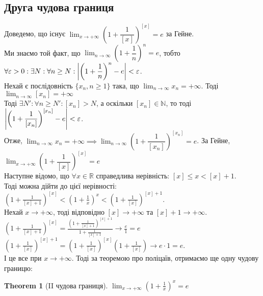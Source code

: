 \documentclass[a4paper, 14pt]{article}
\theoremstyle{theoremdd}
\newtheorem{theorem}{Theorem}[subsection]
\theoremstyle{theoremdd}
\theoremstyle{theoremdd}
\theoremstyle{theoremdd}
\theoremstyle{theoremdd}
\theoremstyle{theoremdd}
\theoremstyle{theoremdd}
\theoremstyle{theoremdd}
\begin{document}
\subsection{Друга чудова границя}
Доведемо, що існує $\displaystyle\lim_{x \to +\infty} \left( 1 + \dfrac{1}{[x]} \right)^{[x]} = e$ за Гейне.\\
Ми знаємо той факт, що $\displaystyle\lim_{n \to \infty} \left( 1 + \dfrac{1}{n} \right)^n = e$, тобто 
$\forall \varepsilon > 0: \exists N: \forall n \geq N: \abs{\left( 1 + \dfrac{1}{n} \right)^n - e} < \varepsilon$.\\
Нехай є послідовність $\{x_n, n \geq 1\}$ така, що $\displaystyle\lim_{n \to \infty} x_n = +\infty$. Тоді $\displaystyle\lim_{n \to \infty} [x_n] = +\infty$\\
Тоді $\exists N': \forall n \geq N': [x_n] > N$, а оскільки $[x_n] \in \mathbb{N}$, то тоді $\abs{\left( 1 + \dfrac{1}{[x_n]} \right)^{[x_n]} - e} < \varepsilon$.\\
Отже, $\displaystyle\lim_{n \to \infty} x_n = +\infty \implies \displaystyle\lim_{n \to \infty} \left( 1 + \dfrac{1}{[x_n]} \right)^{[x_n]} = e$. За Гейне, $\displaystyle\lim_{x \to +\infty} \left( 1 + \dfrac{1}{[x]} \right)^{[x]} = e$
\bigskip \\
Наступне відомо, що $\forall x \in \mathbb{R}$ справедлива нерівність: $[x] \leq x < [x]+1$.\\
Тоді можна дійти до цієї нерівності:\\
$\displaystyle \left(1 + \frac{1}{[x]+1} \right)^{[x]} < \left(1 + \frac{1}{x} \right)^x < \left(1 + \frac{1}{[x]} \right)^{[x]+1}$.\\
Нехай $x \to +\infty$, тоді відповідно $[x] \to + \infty$ та $[x]+1 \to + \infty$.\\
$\displaystyle \left(1 + \frac{1}{[x]+1} \right)^{[x]} = \frac{\displaystyle \left(1 + \frac{1}{[x]+1} \right)^{[x]+1}}{\displaystyle 1 + \frac{1}{[x]+1}} \to \frac{e}{1} = e$\\
$\displaystyle \left(1 + \frac{1}{[x]} \right)^{[x]+1} = \left(1 + \frac{1}{[x]} \right)^{[x]} \left(1 + \frac{1}{[x]} \right) \to e \cdot 1 = e$.\\
І це все при $x \to +\infty$. Тоді за теоремою про поліцаїв, отримаємо ще одну чудову границю:
\begin{theorem}[II чудова границя]
$\displaystyle \lim_{x \to +\infty} \left(1 +\frac{1}{x} \right)^x = e$
\end{theorem}
\end{document}
